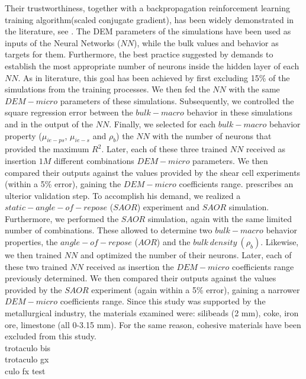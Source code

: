 Their trustworthiness, together with a backpropagation reinforcement learning training algorithm(scaled conjugate gradient), has been widely demonstrated in the literature, see \citet{RefWorks:158}.
The DEM parameters of the simulations have been used as inputs of the Neural Networks ($NN$), while the bulk values and behavior as targets for them.
Furthermore, the best practice suggested by \citet{RefWorks:150} demands to establish the most appropriate number of neurons inside the hidden layer of each $NN$.
As in literature, this goal has been achieved by first excluding 15\% of the simulations from the training processes.
We then fed the $NN$ with the same $DEM-micro$ parameters of these simulations.
Subsequently, we controlled the square regression error between the $bulk-macro$ behavior in these simulations and in the output of the $NN$.
Finally, we selected for each $bulk-macro$ behavior property ($\mu_{ie-ps}$, $\mu_{ie-s}$ and $\rho_b$) the $NN$ with the number of neurons that provided the maximum $R^2$.
Later, each of these three trained $NN$ received as insertion $1M$ different combinations $DEM-micro$ parameters.
We then compared their outputs against the values provided by the shear cell experiments (within a 5\% error), gaining the $DEM-micro$ coefficients range.
\citet{RefWorks:160} prescribes an ulterior validation step.
To accomplish his demand, we realized a $static-angle-of-repose$ ($SAOR$) experiment and $SAOR$ simulation.
Furthermore, we performed the $SAOR$ simulation, again with the same limited number of combinations.
These allowed to determine two $bulk-macro$ behavior properties, the $angle-of-repose$ ($AOR$) and the $bulk ~ density ~ (\rho_b)$.
Likewise, we then trained $NN$ and optimized the number of their neurons.
Later, each of these two trained $NN$ received as insertion the $DEM-micro$ coefficients range previously determined.
We then compared their outputs against the values provided by the $SAOR$ experiment (again within a 5\% error), gaining a narrower $DEM-micro$ coefficients range.
Since this study was supported by the metallurgical industry, the materials examined were: silibeads (2 mm), coke, iron ore, limestone (all 0-3.15 mm).
For the same reason, cohesive materials have been excluded from this study.\\ \label{par:materials}
trotaculo bis \\
trotaculo gx \\
culo fx
test